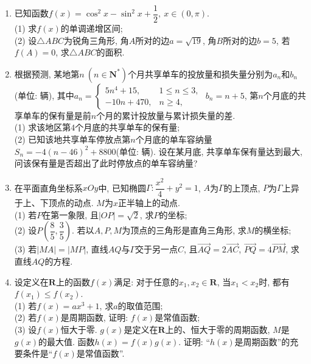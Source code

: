 \documentclass[10pt,a4paper]{article}
\begin{document}
\begin{enumerate}[1.]
\item 已知函数$f(x)=\cos^2 x-\sin^2 x+\dfrac{1}{2}, \ x\in (0,\pi)$.\\
(1) 求$f(x)$的单调递增区间;\\
(2) 设$\triangle ABC$为锐角三角形, 角$A$所对的边$a=\sqrt{19}$, 角$B$所对的边$b=5$, 若$f(A)=0$, 求$\triangle ABC$的面积.
\item 根据预测, 某地第$n \ (n\in \mathbf{N}^*)$个月共享单车的投放量和损失量分别为$a_n$和$b_n$(单位: 辆), 其中$a_n=\begin{cases}
5n^4+15, & 1\le n\le 3,\\ -10n+470, & n \ge 4,
\end{cases}$ $b_n=n+5$, 第$n$个月底的共享单车的保有量是前$n$个月的累计投放量与累计损失量的差.\\
(1) 求该地区第$4$个月底的共享单车的保有量;\\
(2) 已知该地共享单车停放点第$n$个月底的单车容纳量$S_n=-4(n-46)^2+8800$(单位: 辆). 设在某月底, 共享单车保有量达到最大, 问该保有量是否超出了此时停放点的单车容纳量?
\item 在平面直角坐标系$xOy$中, 已知椭圆$\Gamma: \dfrac{x^2}{4}+y^2=1$, $A$为$\Gamma$的上顶点, $P$为$\Gamma$上异于上、下顶点的动点. $M$为$x$正半轴上的动点.\\
(1) 若$P$在第一象限, 且$|OP|=\sqrt{2}$, 求$P$的坐标;\\
(2) 设$P\left(\dfrac{8}{5},\dfrac{3}{5}\right)$. 若以$A,P,M$为顶点的三角形是直角三角形, 求$M$的横坐标;\\
(3) 若$|MA|=|MP|$, 直线$AQ$与$\Gamma$交于另一点$C$, 且$\overrightarrow{AQ}=2\overrightarrow{AC}$, $\overrightarrow{PQ}=4\overrightarrow{PM}$, 求直线$AQ$的方程.
\item 设定义在$\mathbf{R}$上的函数$f(x)$满足: 对于任意的$x_1,x_2\in \mathbf{R}$, 当$x_1<x_2$时, 都有$f(x_1)\le f(x_2)$.\\
(1) 若$f(x)=ax^3+1$, 求$a$的取值范围;\\
(2) 若$f(x)$是周期函数, 证明: $f(x)$是常值函数;\\
(3) 设$f(x)$恒大于零. $g(x)$是定义在$\mathbf{R}$上的、恒大于零的周期函数, $M$是$g(x)$的最大值. 函数$h(x)=f(x)g(x)$. 证明: ``$h(x)$是周期函数''的充要条件是``$f(x)$是常值函数''.

\end{enumerate}


\iffalse













\fi
\end{document}

